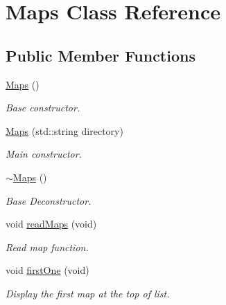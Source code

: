 \hypertarget{class_maps}{\section{Maps Class Reference}
\label{class_maps}
}
\subsection*{Public Member Functions}
\begin{DoxyCompactItemize}
\item 
\hyperlink{class_maps_a87e73431397d1c36dcc2a95ef2b00732}{Maps} ()
\begin{DoxyCompactList}\small\item\em Base constructor. \end{DoxyCompactList}\item 
\hyperlink{class_maps_a9433b5dfd9a51fce5d2b950e97dacfbd}{Maps} (std\+::string directory)
\begin{DoxyCompactList}\small\item\em Main constructor. \end{DoxyCompactList}\item 
\hypertarget{class_maps_aa3fbced631bfb5f4d1fe541a8a29384f}{\hyperlink{class_maps_aa3fbced631bfb5f4d1fe541a8a29384f}{$\sim$\+Maps} ()}\label{class_maps_aa3fbced631bfb5f4d1fe541a8a29384f}

\begin{DoxyCompactList}\small\item\em Base Deconstructor. \end{DoxyCompactList}\item 
void \hyperlink{class_maps_a65ebe26294d69e741ee94d5530597886}{read\+Maps} (void)
\begin{DoxyCompactList}\small\item\em Read map function. \end{DoxyCompactList}\item 
\hypertarget{class_maps_acc65a2a83bdad1c467531b3e25188b91}{void \hyperlink{class_maps_acc65a2a83bdad1c467531b3e25188b91}{first\+One} (void)}\label{class_maps_acc65a2a83bdad1c467531b3e25188b91}

\begin{DoxyCompactList}\small\item\em Display the first map at the top of list. \end{DoxyCompactList}\end{DoxyCompactItemize}


